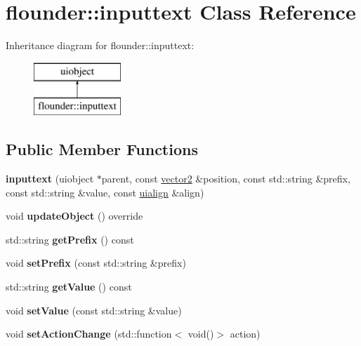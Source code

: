 \hypertarget{classflounder_1_1inputtext}{}\section{flounder\+:\+:inputtext Class Reference}
\label{classflounder_1_1inputtext}
Inheritance diagram for flounder\+:\+:inputtext\+:\begin{figure}[H]
\begin{center}
\leavevmode
\includegraphics[height=2.000000cm]{classflounder_1_1inputtext}
\end{center}
\end{figure}
\subsection*{Public Member Functions}
\begin{DoxyCompactItemize}
\item 
\mbox{\label{classflounder_1_1inputtext_aca56c185b95c971d82206985cd831bf6}} 
{\bfseries inputtext} (uiobject $\ast$parent, const \hyperlink{classflounder_1_1vector2}{vector2} \&position, const std\+::string \&prefix, const std\+::string \&value, const \hyperlink{namespaceflounder_a70f1871d5c05aa8e078dd37501ce10a9}{uialign} \&align)
\item 
\mbox{\label{classflounder_1_1inputtext_a68496c28c8d375db5d9c2f1e7034c7e8}} 
void {\bfseries update\+Object} () override
\item 
\mbox{\label{classflounder_1_1inputtext_a96d00e15d518ff13c89b71b0a01caf4a}} 
std\+::string {\bfseries get\+Prefix} () const
\item 
\mbox{\label{classflounder_1_1inputtext_a58321b833e8a09d930d3e254112e346a}} 
void {\bfseries set\+Prefix} (const std\+::string \&prefix)
\item 
\mbox{\label{classflounder_1_1inputtext_a62ff597549d6a96e0d59cc6a6d2aa9d3}} 
std\+::string {\bfseries get\+Value} () const
\item 
\mbox{\label{classflounder_1_1inputtext_a4317b2a8a39dfd2e654b865191fc27cd}} 
void {\bfseries set\+Value} (const std\+::string \&value)
\item 
\mbox{\label{classflounder_1_1inputtext_a9d643963d290e3c8e1de4d085a8de8e3}} 
void {\bfseries set\+Action\+Change} (std\+::function$<$ void()$>$ action)
\end{DoxyCompactItemize}
